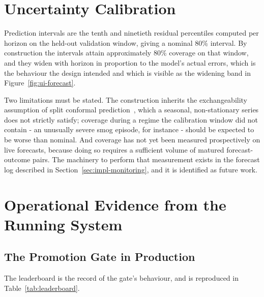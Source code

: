 \section{Uncertainty Calibration}
Prediction intervals are the tenth and ninetieth residual percentiles computed per
horizon on the held-out validation window, giving a nominal 80\% interval. By
construction the intervals attain approximately 80\% coverage on that window, and
they widen with horizon in proportion to the model's actual errors, which is the
behaviour the design intended and which is visible as the widening band in
Figure~\ref{fig:ui-forecast}.

Two limitations must be stated. The construction inherits the exchangeability
assumption of split conformal prediction~\cite{ref:leiconformal}, which a
seasonal, non-stationary series does not strictly satisfy; coverage during a
regime the calibration window did not contain - an unusually severe smog episode,
for instance - should be expected to be worse than nominal. And coverage has not
yet been measured prospectively on live forecasts, because doing so requires a
sufficient volume of matured forecast-outcome pairs. The machinery to perform that
measurement exists in the forecast log described in
Section~\ref{sec:impl-monitoring}, and it is identified as future work.

\section{Operational Evidence from the Running System}

\subsection{The Promotion Gate in Production}
\label{sec:testing-gate}
The leaderboard is the record of the gate's behaviour, and is reproduced in
Table~\ref{tab:leaderboard}.

